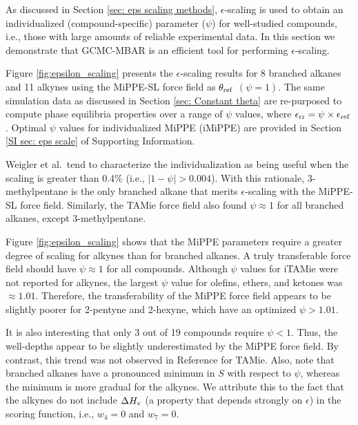\documentclass[journal=jced,manuscript=article]{achemso}
\begin{document}

As discussed in Section \ref{sec: eps scaling methods}, $\epsilon$-scaling is used to obtain an individualized (compound-specific) parameter ($\psi$) for well-studied compounds, i.e., those with large amounts of reliable experimental data. \cite{Weidler2018} In this section we demonstrate that GCMC-MBAR is an efficient tool for performing $\epsilon$-scaling. 


Figure \ref{fig:epsilon_scaling} presents the $\epsilon$-scaling results for 8 branched alkanes and 11 alkynes using the MiPPE-SL force field as $\theta_{\rm ref}$ $(\psi = 1)$. The same simulation data as discussed in Section \ref{sec: Constant theta} are re-purposed to compute phase equilibria properties over a range of $\psi$ values, where $\epsilon_{\rm rr} = \psi \times \epsilon_{\rm ref}$. Optimal $\psi$ values for individualized MiPPE (iMiPPE) are provided in Section \ref{SI sec: eps scale} of Supporting Information. 

Weigler et al.~tend to characterize the individualization as being useful when the scaling is greater than 0.4\% (i.e., $|1 - \psi| > 0.004$).\cite{Weidler2018} With this rationale, 3-methylpentane is the only branched alkane that merits $\epsilon$-scaling with the MiPPE-SL force field. Similarly, the TAMie force field also found $\psi \approx 1$ for all branched alkanes, except 3-methylpentane. 

Figure \ref{fig:epsilon_scaling} shows that the MiPPE parameters require a greater degree of scaling for alkynes than for branched alkanes. A truly transferable force field should have $\psi \approx 1$ for all compounds. Although $\psi$ values for iTAMie were not reported for alkynes, the largest $\psi$ value for olefins, ethers, and ketones was $\approx 1.01$.\cite{Weidler2018} Therefore, the transferability of the MiPPE force field appears to be slightly poorer for 2-pentyne and 2-hexyne, which have an optimized $\psi > 1.01$. 

It is also interesting that only 3 out of 19 compounds require $\psi < 1$. Thus, the well-depths appear to be slightly underestimated by the MiPPE force field. By contrast, this trend was not observed in Reference  for TAMie. Also, note that branched alkanes have a pronounced minimum in $S$ with respect to $\psi$, whereas the minimum is more gradual for the alkynes. We attribute this to the fact that the alkynes do not include $\Delta H_{\rm v}$ (a property that depends strongly on $\epsilon$) in the scoring function, i.e., $w_4 = 0$ and $w_7 = 0$. 
\end{document}

